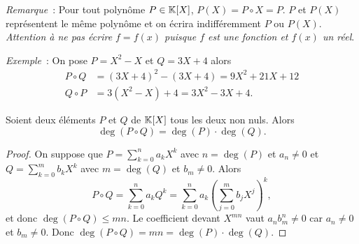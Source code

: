 \emph{Remarque}~: Pour tout polynôme $P \in \mathbb{K}[X]$, $P(X)=P \circ X = P$. $P$ et $P(X)$ représentent le même polynôme et on écrira indifféremment $P$ ou $P(X)$. \emph{Attention à ne pas écrire $f=f(x)$ puisque $f$ est une fonction et $f(x)$ un réel}.

\emph{Exemple}~: On pose $P=X^2-X$ et $Q=3X+4$ alors
\begin{align}
  P \circ Q &= (3X+4)^2-(3X+4) = 9X^2+21X+12\\
  Q \circ P &= 3(X^2-X)+4 = 3X^2-3X+4.
\end{align}

\begin{prop}
  Soient deux éléments $P$ et $Q$ de $\mathbb{K}[X]$ tous les deux non nuls. Alors
  \begin{equation}
    \deg(P\circ Q)=\deg(P) \cdot \deg(Q).
  \end{equation}
\end{prop}
\begin{proof}
  On suppose que $P=\sum_{k=0}^n a_k X^k$ avec $n=\deg(P)$ et $a_n \neq 0$ et $Q=\sum_{k=0}^m b_k X^k$ avec $m=\deg(Q)$ et $b_m \neq 0$. Alors
  \begin{equation}
    P \circ Q = \sum_{k=0}^n a_k Q^k = \sum_{k=0}^n a_k \left(\sum_{j=0}^m b_j X^j\right)^k,
  \end{equation}
  et donc $\deg(P \circ Q) \leqslant mn$. Le coefficient devant $X^{mn}$ vaut $a_n b_m^n \neq 0$ car $a_n \neq 0$ et $b_m \neq 0$. Donc $\deg(P \circ Q) =mn = \deg(P) \cdot \deg(Q)$.
\end{proof}

